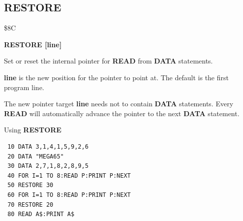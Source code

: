 
\newpage
\subsection{RESTORE}
\begin{description}[leftmargin=2cm,style=nextline]
\item [Token:] \$8C
\item [Format:] {\bf RESTORE [line]}
\item [Usage:]  Set or reset the internal pointer for
                {\bf READ} from {\bf DATA} statements.

                {\bf line} is the new position for the
                pointer to point at. The default is the
                first program line.

\item [Remarks:] The new pointer target {\bf line}
                 needs not to contain {\bf DATA} statements.
                 Every {\bf READ} will automatically advance
                 the pointer to the next {\bf DATA} statement.
\item [Example:] Using {\bf RESTORE}

\begin{tcolorbox}[colback=black,coltext=white]
\verbatimfont{\codefont}
\begin{verbatim}
 10 DATA 3,1,4,1,5,9,2,6
 20 DATA "MEGA65"
 30 DATA 2,7,1,8,2,8,9,5
 40 FOR I=1 TO 8:READ P:PRINT P:NEXT
 50 RESTORE 30
 60 FOR I=1 TO 8:READ P:PRINT P:NEXT
 70 RESTORE 20
 80 READ A$:PRINT A$
\end{verbatim}
\end{tcolorbox}
\end{description}


\newpage
